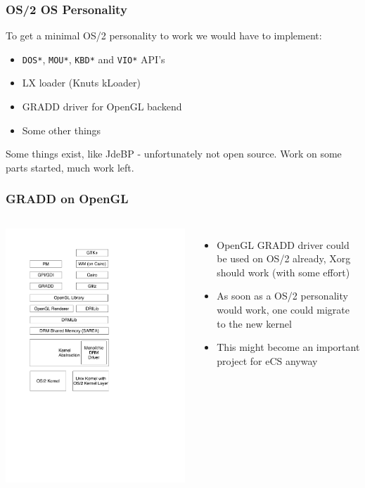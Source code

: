 \documentclass{beamer}
\begin{document}
\begin{frame}
\frametitle{OS/2 OS Personality}
To get a minimal OS/2 personality to work we would have to implement:
\begin{itemize}[<+->]
  \item \texttt{DOS*}, \texttt{MOU*}, \texttt{KBD*} and \texttt{VIO*} API's
  \item LX loader (Knuts kLoader)
  \item GRADD driver for OpenGL backend
  \item Some other things
\end{itemize}
Some things exist, like JdeBP - unfortunately not open source. Work on some
parts started, much work left.
\end{frame}

\begin{frame}
\frametitle{GRADD on OpenGL}
\begin{columns}
\column{3cm}
\includegraphics[scale=0.3]{ogl-gradd.pdf}
\column{6cm}
\begin{itemize}[<+->]
  \item OpenGL GRADD driver could be  used on OS/2 already, Xorg should work (with some effort)
  \item As soon as a OS/2 personality would work, one could migrate to the new
  kernel 
  \item This might become an important project for eCS anyway
\end{itemize}
\end{columns}
\end{frame}
\end{document}
